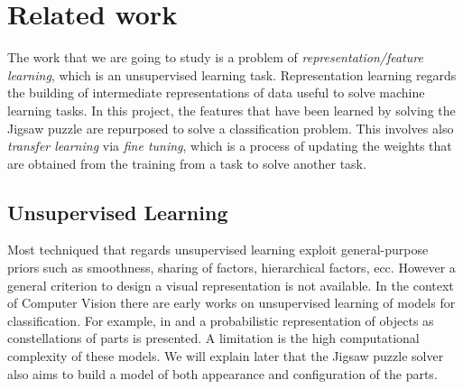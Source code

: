 \section{Related work}
The work that we are going to study is a problem of \emph{representation/feature learning}, which is an unsupervised learning task. Representation learning regards the building of intermediate representations of data useful to solve machine learning tasks. In this project, the features that have been learned by solving the Jigsaw puzzle are repurposed to solve a classification problem. This involves also \emph{transfer learning} via \emph{fine tuning}, which is a process of updating the weights that are obtained from the training from a task to solve another task.

\subsection{Unsupervised Learning}
Most techniqued that regards unsupervised learning exploit general-purpose priors such as smoothness, sharing of factors, hierarchical factors, ecc. However a general criterion to design a visual representation is not available. In the context of Computer Vision there are early works on unsupervised learning of models for classification. For example, in \cite{unsupervised_scale_invariant_learning} and \cite{unsupervised_learning_model_recognition} a probabilistic representation of objects as constellations of parts is presented. A limitation is the high computational complexity of these models. We will explain later that the Jigsaw puzzle solver also aims to build a model of both appearance and configuration of the parts.

